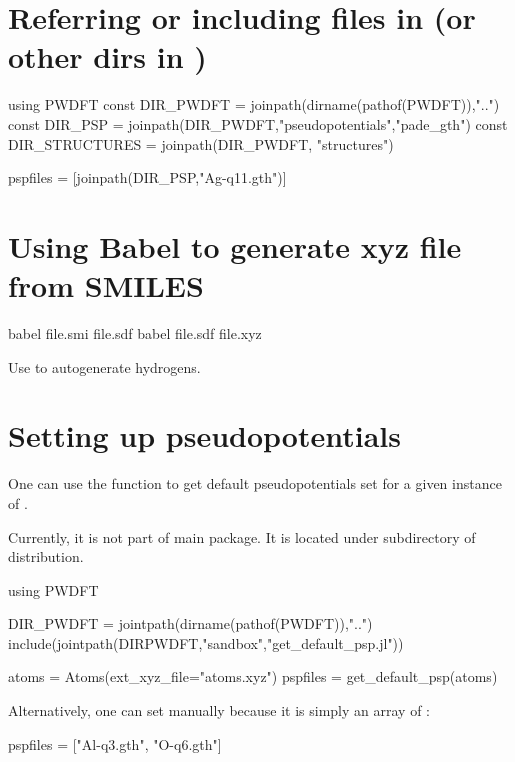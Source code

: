 \section{Referring or including files in  (or other dirs in )}

\begin{juliacode}
using PWDFT
const DIR_PWDFT = joinpath(dirname(pathof(PWDFT)),"..")
const DIR_PSP = joinpath(DIR_PWDFT,"pseudopotentials","pade_gth")
const DIR_STRUCTURES = joinpath(DIR_PWDFT, "structures")

pspfiles = [joinpath(DIR_PSP,"Ag-q11.gth")]
\end{juliacode}


\section{Using Babel to generate xyz file from SMILES}

\begin{textcode}
babel file.smi file.sdf
babel file.sdf file.xyz
\end{textcode}

Use  to autogenerate hydrogens.



\section{Setting up pseudopotentials}

One can use the function  to get default
pseudopotentials set for a given instance of .

Currently, it is not part of main  package. It is located
under  subdirectory of  distribution.

\begin{juliacode}
using PWDFT

DIR_PWDFT = jointpath(dirname(pathof(PWDFT)),"..")
include(jointpath(DIRPWDFT,"sandbox","get_default_psp.jl"))

atoms = Atoms(ext_xyz_file="atoms.xyz")
pspfiles = get_default_psp(atoms)
\end{juliacode}

Alternatively, one can set  manually because it is simply
an array of :
\begin{juliacode}
pspfiles = ["Al-q3.gth", "O-q6.gth"]
\end{juliacode}

